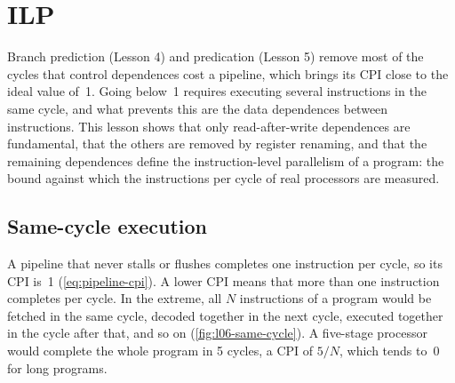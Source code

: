 \documentclass[../main.tex]{subfiles}
\begin{document}
\chapter{ILP}

Branch prediction (Lesson 4) and predication (Lesson 5) remove most of the
cycles that control dependences cost a pipeline, which brings its CPI close
to the ideal value of~1.  Going below~1 requires executing several
instructions in the same cycle, and what prevents this are the data
dependences between instructions.  This lesson shows that only
read-after-write dependences are fundamental, that the others are removed by
register renaming, and that the remaining dependences define the
instruction-level parallelism of a program: the bound against which the
instructions per cycle of real processors are measured.

\section{Same-cycle execution}
\label{sec:l06-same-cycle}

A pipeline that never stalls or flushes completes one instruction per cycle,
so its CPI is~1 (\cref{eq:pipeline-cpi}).  A lower CPI means that more than one instruction completes per
cycle.  In the extreme, all $N$ instructions of a program would be fetched in
the same cycle, decoded together in the next cycle, executed together in the
cycle after that, and so on (\cref{fig:l06-same-cycle}).  A five-stage
processor would complete the whole program in 5 cycles, a CPI of $5/N$,
which tends to~0 for long programs.
\end{document}
